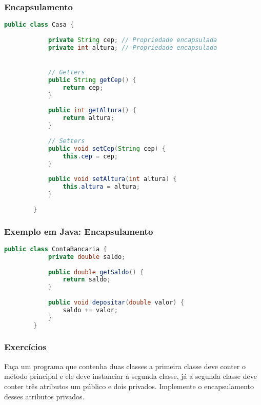 \begin{frame}[fragile]
	\frametitle{Encapsulamento}
	\begin{lstlisting}[language=java]
		public class Casa {
			
			private String cep; // Propriedade encapsulada
			private int altura; // Propriedade encapsulada


			// Getters						
			public String getCep() {
				return cep;
			}
			
			public int getAltura() {
				return altura;
			}
			
			// Setters
			public void setCep(String cep) {
				this.cep = cep;
			}
			
			public void setAltura(int altura) {
				this.altura = altura;
			}
			
		}
	\end{lstlisting}
\end{frame}

\begin{frame}[fragile]
	\frametitle{Exemplo em Java: Encapsulamento}
	\begin{lstlisting}[language=java]
		public class ContaBancaria {
			private double saldo;
			
			public double getSaldo() {
				return saldo;
			}
			
			public void depositar(double valor) {
				saldo += valor;
			}
		}
	\end{lstlisting}
\end{frame}

\begin{frame}
	\frametitle{Exercícios}
	\par Faça um programa que contenha duas classes a primeira classe deve conter o método principal e ele deve instanciar a segunda classe, já a segunda classe deve conter três atributos um público e dois privados. Implemente o encapsulamento desses atributos privados.
	
\end{frame}